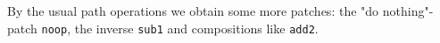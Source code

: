 By the usual path operations we obtain some more patches: the "do nothing"-patch \texttt{noop},
the inverse \texttt{sub1} and compositions like \texttt{add2}.
\begin{code}%
%
\>[2]\AgdaSpace{}%
\AgdaSpace{}%
\AgdaSpace{}%
\AgdaSymbol{:}\AgdaSpace{}%
\<%
\\
%
\>[2]\AgdaSpace{}%
\AgdaSymbol{=}\AgdaSpace{}%
\<%
\\
%
\>[2]\AgdaSpace{}%
\AgdaSymbol{=}\AgdaSpace{}%
\AgdaSpace{}%
\<%
\\
%
\>[2]\AgdaSpace{}%
\AgdaSymbol{=}\AgdaSpace{}%
\AgdaSpace{}%
\AgdaSpace{}%
\<%
\end{code}

